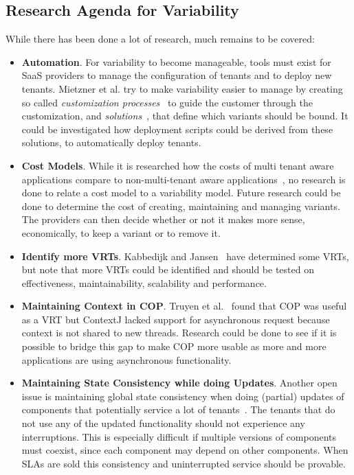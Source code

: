 \subsection{Research Agenda for Variability}
While there has been done a lot of research, much remains to be covered:
\begin{itemize}

\item \textbf{Automation}.
For variability to become manageable, tools must exist for \ac{SaaS} providers to manage the configuration of tenants and to deploy new tenants. Mietzner et al. try to make variability easier to manage by creating so called \textit{customization processes}~\cite{mietzner2008generation} to guide the customer through the customization, and \textit{solutions}~\cite{mietzner2008defining}, that define which variants should be bound. It could be investigated how deployment scripts could be derived from these solutions, to automatically deploy tenants.

\item \textbf{Cost Models}.
While it is researched how the costs of multi tenant aware applications compare to non-multi-tenant aware applications~\cite{mietzner2009variability}, no research is done to relate a cost model to a variability model. Future research could be done to determine the cost of creating, maintaining and managing variants. The providers can then decide whether or not it makes more sense, economically, to keep a variant or to remove it.

\item \textbf{Identify more \aclp{VRT}}. 
Kabbedijk and Jansen~\cite{kabbedijk2011variability} have determined some \acp{VRT}, but note that more \acp{VRT} could be identified and should be tested on effectiveness, maintainability, scalability and performance.

\item \textbf{Maintaining Context in \ac{COP}}. 
Truyen et al.~\cite{truyen2012context} found that \ac{COP} was useful as a \ac{VRT} but ContextJ lacked support for asynchronous request because context is not shared to new threads. Research could be done to see if it is possible to bridge this gap to make \ac{COP} more usable as more and more applications are using asynchronous functionality.

\item \textbf{Maintaining State Consistency while doing Updates}.
Another open issue is maintaining global state consistency when doing (partial) updates of components that potentially service a lot of tenants~\cite{truyen2012context,dumitracs2009upgrades}. The tenants that do not use any of the updated functionality should not experience any interruptions. This is especially difficult if multiple versions of components must coexist, since each component may depend on other components. When \acp{SLA} are sold this consistency and uninterrupted service should be provable.

\end{itemize}
